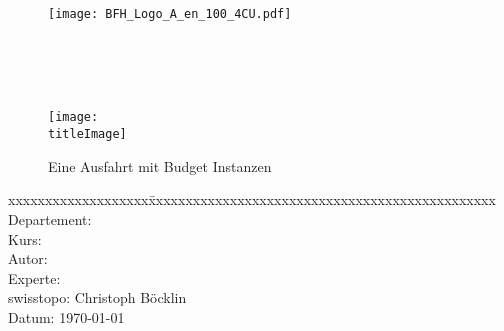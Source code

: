 \thispagestyle{empty}

\begin{figure}
	\texttt{[image: BFH\_Logo\_A\_en\_100\_4CU.pdf]}
\end{figure}


\begin{minipage}[c][3cm][c]{\linewidth} {
	\centering
	\vspace*{2cm}
	{\fontsize{24pt}{0pt}\selectfont \textbf{\doctitle}}  \\
	\vspace*{0.6cm}
	{\fontsize{20pt}{0pt}\selectfont {Geodeatenprozessierung\\ mit Budget Instanzen}}  \\
	\vspace*{1cm}
	{\fontsize{14pt}{0pt}\selectfont \doctype}  \\
}
\end{minipage}


\vspace{1.5cm}


\begin{figure}[H]
	\centering
	\makebox[0.8\linewidth]{\color{BFHGray} \rule{0.8\linewidth}{10pt}}
	\texttt{[image: \\titleImage]}
	\makebox[0.8\linewidth]{\color{BFHGray} \rule{0.8\linewidth}{10pt}}
    \caption{Eine Ausfahrt mit Budget Instanzen\space\cite{HippieCar:1}}
\end{figure}

\vfill

\begin{minipage}[c][3cm][c]{\linewidth}
{
	\centering
	\begin{tabbing}
		xxxxxxxxxxxxxxxxxxx\=xxxxxxxxxxxxxxxxxxxxxxxxxxxxxxxxxxxxxxxxxxxxxxx \kill
		Departement:	\> \fieldofstudies \\
		Kurs:			\> \course \\
		Autor:		\> \docauthor \\
		Experte:		\> \prof \\
		swisstopo:      \> Christoph Böcklin \\
		Datum:			\> \today \\
	\end{tabbing}
}
\end{minipage}

\pagebreak